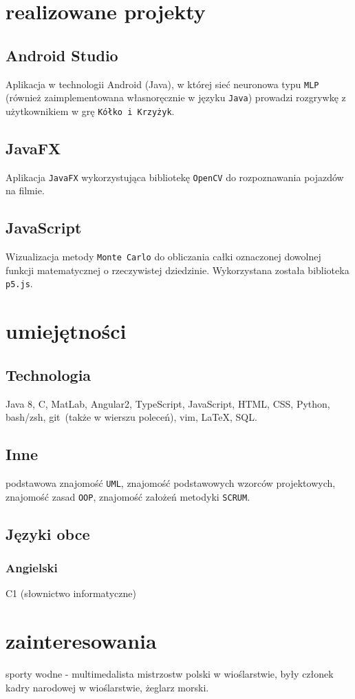 \documentclass{article}
\begin{document}
\begin{minipage}[t]{.4\textwidth}

	\section{realizowane projekty}
	\subsection{Android Studio}
	Aplikacja w technologii Android (Java), w której sieć neuronowa typu \verb+MLP+ (również zaimplementowana własnoręcznie w języku \verb+Java+) prowadzi rozgrywkę z użytkownikiem w grę \verb+Kółko i Krzyżyk+.

	\subsection{JavaFX}
	Aplikacja \verb+JavaFX+ wykorzystująca bibliotekę \verb+OpenCV+ do rozpoznawania pojazdów na filmie.

	\subsection{JavaScript}
	Wizualizacja metody \verb+Monte Carlo+ do obliczania całki oznaczonej dowolnej funkcji matematycznej o rzeczywistej dziedzinie. Wykorzystana została biblioteka \verb+p5.js+.

	\vspace{1em}

	\section{umiejętności}
	\subsection{Technologia}
	Java 8, C, MatLab, Angular2, TypeScript, JavaScript, HTML, CSS, Python, bash/zsh, git~(także w wierszu poleceń), vim, \LaTeX, SQL.

	\subsection{Inne}
	podstawowa znajomość \verb+UML+, znajomość podstawowych wzorców projektowych, znajomość zasad \verb+OOP+, znajomość założeń metodyki \verb+SCRUM+.

	\subsection{Języki obce}
	\subsubsection{Angielski} C1 (słownictwo informatyczne)

	\vspace{1em}

	\section{zainteresowania}
	sporty wodne - multimedalista mistrzostw polski w wioślarstwie, były członek kadry narodowej w wioślarstwie, żeglarz morski.

\end{minipage}
\end{document}
